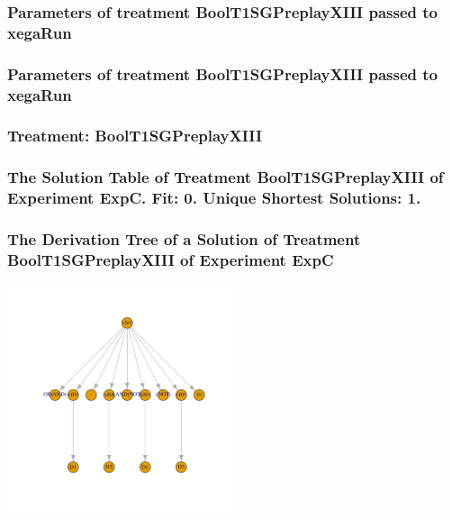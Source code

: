 \documentclass[18pt,c]{beamer}
\begin{document}
 \begin{frame}
 \fontsize{8pt}{9pt}\selectfont
 \frametitle{  Parameters of treatment BoolT1SGPreplayXIII passed to xegaRun
 }

 \label{ExpCtParmTable002.tex}  
 \end{frame}


 \begin{frame}
 \fontsize{8pt}{9pt}\selectfont
 \frametitle{  Parameters of treatment BoolT1SGPreplayXIII passed to xegaRun
 }

 \label{ExpCtParmTable003.tex}  
 \end{frame}

 \begin{frame}
 \fontsize{8pt}{9pt}\selectfont
 \frametitle{ Treatment: BoolT1SGPreplayXIII }

 \label{ExpCStatsTable007.tex}  
 \end{frame}

 \begin{frame}
 \fontsize{8pt}{9pt}\selectfont
 \frametitle{ The Solution Table of Treatment BoolT1SGPreplayXIII of Experiment ExpC. Fit: 0. Unique Shortest Solutions: 1. }

 \label{ExpCSolutionTable000.tex}  
 \end{frame}

 \begin{frame}
 \frametitle{ The Derivation Tree of a Solution of Treatment BoolT1SGPreplayXIII of Experiment ExpC }
 \begin{center}
\includegraphics[width=0.5\textwidth, angle=0]
{ExpCDerivationTreeFigure000.pdf}
 \end{center}
 \label{report/ExpCDerivationTreeFigure000.pdf}  
 \end{frame}
\end{document}
